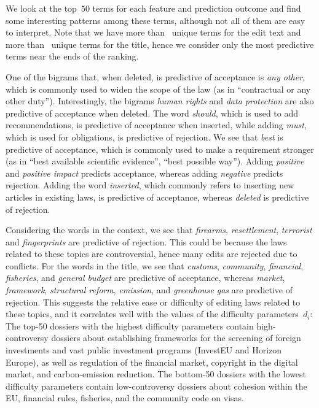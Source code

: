 We look at the top~$50$ terms for each feature and prediction outcome and find some interesting patterns among these terms, although not all of them are easy to interpret.
Note that we have more than~ unique terms for the edit text and more than~ unique terms for the title, hence we consider only the most predictive terms near the ends of the ranking.

One of the bigrams that, when deleted, is predictive of acceptance is \textit{any other}, which is commonly used to widen the scope of the law (as in ``contractual or any other duty'').
Interestingly, the bigrams \textit{human rights} and \textit{data protection} are also predictive of acceptance when deleted.
The word \textit{should}, which is used to add recommendations, is predictive of acceptance when inserted, while adding \textit{must}, which is used for obligations, is predictive of rejection.
We see that \textit{best} is predictive of acceptance, which is commonly used to make a requirement stronger (as in ``best available scientific evidence'', ``best possible way'').
Adding \textit{positive} and \textit{positive impact} predicts acceptance, whereas adding \textit{negative} predicts rejection.
Adding the word \textit{inserted}, which commonly refers to inserting new articles in existing laws, is predictive of acceptance, whereas \textit{deleted} is predictive of rejection.

Considering the words in the context, we see that \textit{firearms}, \textit{resettlement}, \textit{terrorist} and \textit{fingerprints} are predictive of rejection.
This could be because the laws related to these topics are controversial, hence many edits are rejected due to conflicts.
For the words in the title, we see that \textit{customs}, \textit{community}, \textit{financial}, \textit{fisheries}, and \textit{general budget} are predictive of acceptance, whereas \textit{market}, \textit{framework}, \textit{structural reform}, \textit{emission},  and \textit{greenhouse gas} are predictive of rejection.
This suggests the relative ease or difficulty of editing laws related to these topics, and it correlates well with the values of the difficulty parameters~$d_i$:
The top-50 dossiers with the highest difficulty parameters contain high-controversy dossiers about establishing frameworks for the screening of foreign investments and vast public investment programs (InvestEU and Horizon Europe), as well as regulation of the financial market, copyright in the digital market, and carbon-emission reduction.
The bottom-50 dossiers with the lowest difficulty parameters contain low-controversy dossiers about cohesion within the EU, financial rules, fisheries, and the community code on visas.

